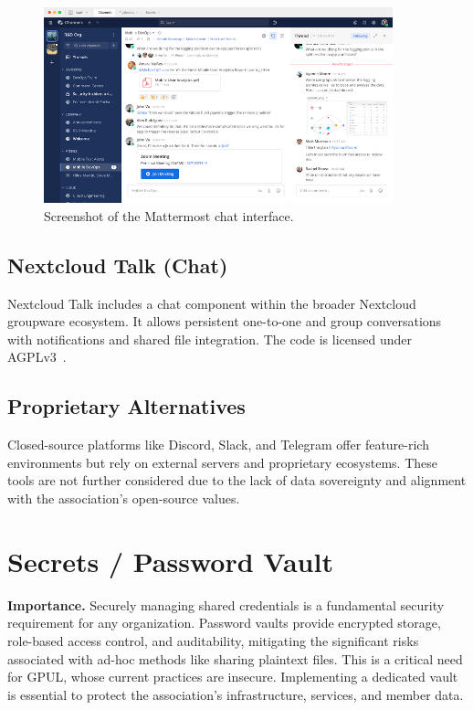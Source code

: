\begin{figure}[h!]
  \centering
  \includegraphics[width=0.9\textwidth]{imaxes/mattermost-ui.png}
  \caption{Screenshot of the Mattermost chat interface.}
  \label{fig:mattermost-ui}
\end{figure}

\subsection*{Nextcloud Talk (Chat)}

Nextcloud Talk includes a chat component within the broader Nextcloud groupware ecosystem. It allows persistent one-to-one and group conversations with notifications and shared file integration. The code is licensed under AGPLv3~\cite{nextcloud-talk-docs}.

\subsection*{Proprietary Alternatives}

Closed-source platforms like Discord, Slack, and Telegram offer feature-rich environments but rely on external servers and proprietary ecosystems. These tools are not further considered due to the lack of data sovereignty and alignment with the association's open-source values.

\section{Secrets / Password Vault}

\textbf{Importance.} Securely managing shared credentials is a fundamental security requirement for any organization. Password vaults provide encrypted storage, role-based access control, and auditability, mitigating the significant risks associated with ad-hoc methods like sharing plaintext files. This is a critical need for GPUL, whose current practices are insecure. Implementing a dedicated vault is essential to protect the association's infrastructure, services, and member data.


